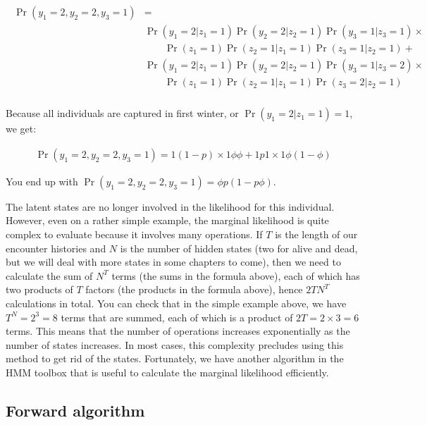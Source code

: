 \documentclass[
  12pt,
]{krantz}
\begin{document}
\begin{align*}
\begin{split}
\Pr(y_1 = 2, y_2 = 2, y_3 = 1) &= \\
& \Pr(y_1 = 2 | z_1 = 1) \Pr(y_2 = 2 | z_2 = 1) \Pr(y_3 = 1 | z_3 = 1) \times \\ 
& \qquad \Pr(z_1 = 1) \Pr(z_2 = 1 | z_1 = 1) \Pr(z_3 = 1 | z_2 = 1) +\\
&  \Pr(y_1 = 2 | z_1 = 1) \Pr(y_2 = 2 | z_2 = 1) \Pr(y_3 = 1 | z_3 = 2) \times\\ 
& \qquad \Pr(z_1 = 1) \Pr(z_2 = 1 | z_1 = 1) \Pr(z_3 = 2 | z_2 = 1)\\
\end{split}
\end{align*}

Because all individuals are captured in first winter, or \(\Pr(y_1 = 2 | z_1 = 1) = 1\), we get:

\begin{align*}
\Pr(y_1 = 2, y_2 = 2, y_3 = 1) =  1 (1-p) \times 1 \phi \phi + 1 p 1 \times 1 \phi (1-\phi)
\end{align*}

You end up with \(\Pr(y_1 = 2, y_2 = 2, y_3 = 1) = \phi p (1 - p\phi)\).

The latent states are no longer involved in the likelihood for this individual. However, even on a rather simple example, the marginal likelihood is quite complex to evaluate because it involves many operations. If \(T\) is the length of our encounter histories and \(N\) is the number of hidden states (two for alive and dead, but we will deal with more states in some chapters to come), then we need to calculate the sum of \(N^T\) terms (the sums in the formula above), each of which has two products of \(T\) factors (the products in the formula above), hence \(2TN^T\) calculations in total. You can check that in the simple example above, we have \(T^N = 2^3 = 8\) terms that are summed, each of which is a product of \(2T = 2 \times 3 = 6\) terms. This means that the number of operations increases exponentially as the number of states increases. In most cases, this complexity precludes using this method to get rid of the states. Fortunately, we have another algorithm in the HMM toolbox that is useful to calculate the marginal likelihood efficiently.

\hypertarget{forward-algorithm}{%
\subsection{Forward algorithm}\label{forward-algorithm}}
\end{document}
